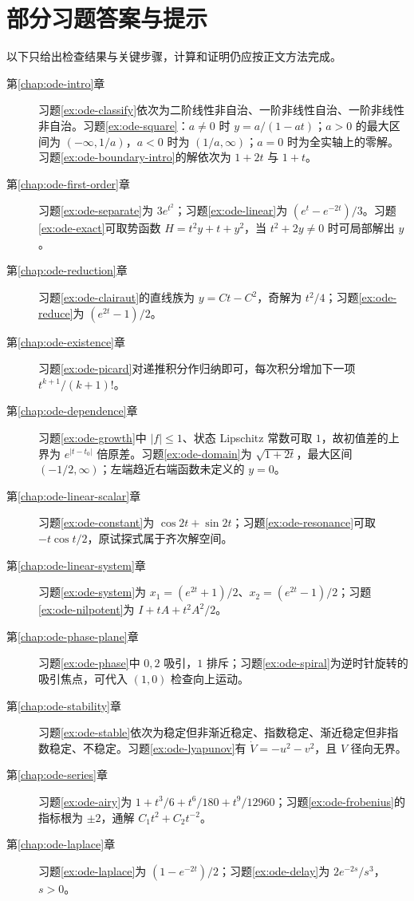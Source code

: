 \documentclass[UTF8,12pt,a4paper,fontset=fandol]{ctexbook}
\begin{document}
\section{部分习题答案与提示}
以下只给出检查结果与关键步骤，计算和证明仍应按正文方法完成。
\begin{description}
 \item[第\ref{chap:ode-intro}章] 习题\ref{ex:ode-classify}依次为二阶线性非自治、一阶非线性自治、一阶非线性非自治。习题\ref{ex:ode-square}：$a\ne0$ 时 $y=a/(1-at)$；$a>0$ 的最大区间为 $(-\infty,1/a)$，$a<0$ 时为 $(1/a,\infty)$；$a=0$ 时为全实轴上的零解。习题\ref{ex:ode-boundary-intro}的解依次为 $1+2t$ 与 $1+t$。
 \item[第\ref{chap:ode-first-order}章] 习题\ref{ex:ode-separate}为 $3e^{t^2}$；习题\ref{ex:ode-linear}为 $(e^t-e^{-2t})/3$。习题\ref{ex:ode-exact}可取势函数 $H=t^2y+t+y^2$，当 $t^2+2y\ne0$ 时可局部解出 $y$。
 \item[第\ref{chap:ode-reduction}章] 习题\ref{ex:ode-clairaut}的直线族为 $y=Ct-C^2$，奇解为 $t^2/4$；习题\ref{ex:ode-reduce}为 $(e^{2t}-1)/2$。
 \item[第\ref{chap:ode-existence}章] 习题\ref{ex:ode-picard}对递推积分作归纳即可，每次积分增加下一项 $t^{k+1}/(k+1)!$。
 \item[第\ref{chap:ode-dependence}章] 习题\ref{ex:ode-growth}中 $|f|\leq1$、状态 Lipschitz 常数可取 $1$，故初值差的上界为 $e^{|t-t_0|}$ 倍原差。习题\ref{ex:ode-domain}为 $\sqrt{1+2t}$，最大区间 $(-1/2,\infty)$；左端趋近右端函数未定义的 $y=0$。
 \item[第\ref{chap:ode-linear-scalar}章] 习题\ref{ex:ode-constant}为 $\cos2t+\sin2t$；习题\ref{ex:ode-resonance}可取 $-t\cos t/2$，原试探式属于齐次解空间。
 \item[第\ref{chap:ode-linear-system}章] 习题\ref{ex:ode-system}为 $x_1=(e^{2t}+1)/2$、$x_2=(e^{2t}-1)/2$；习题\ref{ex:ode-nilpotent}为 $I+tA+t^2A^2/2$。
 \item[第\ref{chap:ode-phase-plane}章] 习题\ref{ex:ode-phase}中 $0,2$ 吸引，$1$ 排斥；习题\ref{ex:ode-spiral}为逆时针旋转的吸引焦点，可代入 $(1,0)$ 检查向上运动。
 \item[第\ref{chap:ode-stability}章] 习题\ref{ex:ode-stable}依次为稳定但非渐近稳定、指数稳定、渐近稳定但非指数稳定、不稳定。习题\ref{ex:ode-lyapunov}有 $\dot V=-u^2-v^2$，且 $V$ 径向无界。
 \item[第\ref{chap:ode-series}章] 习题\ref{ex:ode-airy}为 $1+t^3/6+t^6/180+t^9/12960$；习题\ref{ex:ode-frobenius}的指标根为 $\pm2$，通解 $C_1t^2+C_2t^{-2}$。
 \item[第\ref{chap:ode-laplace}章] 习题\ref{ex:ode-laplace}为 $(1-e^{-2t})/2$；习题\ref{ex:ode-delay}为 $2e^{-2s}/s^3$，$s>0$。

\end{description}
\end{document}
